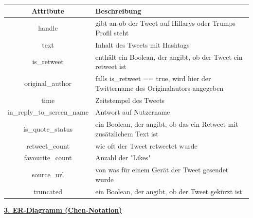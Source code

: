 \documentclass[a4paper ,8pt,x11names]{article}
\begin{document}
\begin{flushleft}
\begin{table}[!htb] 
 \begin{tabular}{|c|p{8cm}|}\hline
   \textbf{Attribute} & \textbf{Beschreibung} \\ \hline \hline
   handle & gibt an ob der Tweet auf Hillarys oder Trumps Profil steht \\ \hline
   text & Inhalt des Tweets mit Hashtags \\ \hline
   is\_retweet & enthält ein Boolean, der angibt, ob der Tweet ein retweet ist \\ \hline
   original\_author & falls is\_retweet == true, wird hier der Twittername des Originalautors angegeben \\ \hline
   time & Zeitstempel des Tweets \\ \hline
   in\_reply\_to\_screen\_name & Antwort auf Nutzername \\ \hline
   is\_quote\_status & ein Boolean, der angibt, ob das ein Retweet mit zusätzlichem Text ist \\ \hline
   retweet\_count & wie oft der Tweet retweetet wurde \\ \hline
   favourite\_count & Anzahl der "Likes" \\ \hline
   source\_url & von was für einem Gerät der Tweet gesendet wurde \\ \hline
   truncated & ein Boolean, der angibt, ob der Tweet gekürzt ist \\ \hline
 \end{tabular}
\end{table}
\end{flushleft}

\newpage
\large{\textbf{\underline{3. ER-Diagramm (Chen-Notation)}}}\\
\end{document}

